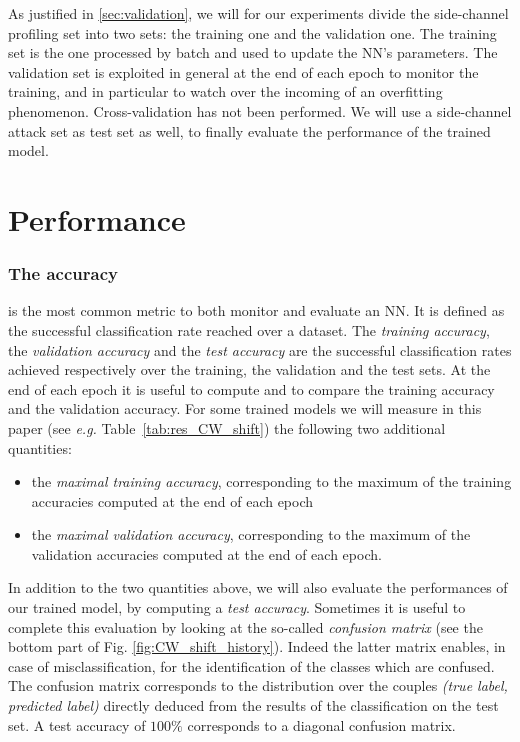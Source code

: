 As justified in \ref{sec:validation}, we will for our experiments divide the side-channel profiling set into two sets: the training one and the validation one. The training set is the one processed by batch and used to update the NN's parameters. The validation set is exploited in general at the end of each epoch to monitor the training, and in particular to watch over the incoming of an overfitting phenomenon. Cross-validation has not been performed. We will use a side-channel attack set as test set as well, to finally evaluate the performance of the trained model.


\section{Performance }
\subsubsection{The accuracy} is the most common metric to both monitor and evaluate an NN. It is defined as the successful classification rate reached over a dataset. The {\em training accuracy}, the \emph{validation accuracy} and the \emph{test accuracy} are the successful classification rates achieved respectively over the training, the validation and the test sets. At the end of each epoch it is useful to compute and to compare the training accuracy and the validation accuracy. For some trained models we will measure in this paper (see \emph{e.g.} Table~\ref{tab:res_CW_shift}) the following two additional quantities: 
\begin{itemize}
\item the \emph{maximal training accuracy}, corresponding to the maximum of the training accuracies computed at the end of each epoch
\item the \emph{maximal validation accuracy}, corresponding to the maximum of the validation accuracies computed at the end of each epoch.
\end{itemize}
In addition to the two quantities above, we will also evaluate the performances of our trained model, by computing a \emph{test accuracy}. Sometimes it is useful to complete this evaluation by looking at the so-called \emph{confusion matrix} (see the bottom part of Fig. \ref{fig:CW_shift_history}). Indeed the latter matrix enables, in case of misclassification, for the identification of the classes which are confused. The confusion matrix corresponds to the distribution over the couples \emph{(true label, predicted label)} directly deduced from the results of the classification on the test set. A test accuracy of $100\%$ corresponds to a diagonal confusion matrix.\\

